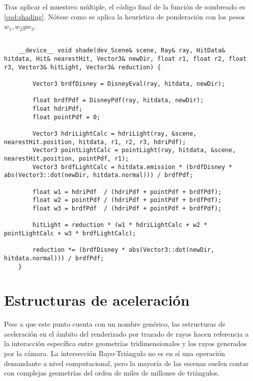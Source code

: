 Tras aplicar el muestreo múltiple, el código final de la función de sombreado es \autoref{cod:shading}. Nótese como se aplica la heurística de ponderación con los pesos $w_1, w_2 y w_3$.

\begin{minipage}[c]{0.95\textwidth}
\begin{lstlisting}[label={cod:shading}, caption={Código para el muestreo por importancia múltiple}]

	__device__ void shade(dev_Scene& scene, Ray& ray, HitData& hitdata, Hit& nearestHit, Vector3& newDir, float r1, float r2, float r3, Vector3& hitLight, Vector3& reduction) {

		Vector3 brdfDisney = DisneyEval(ray, hitdata, newDir);

		float brdfPdf = DisneyPdf(ray, hitdata, newDir);
		float hdriPdf;
		float pointPdf = 0;

		Vector3 hdriLightCalc = hdriLight(ray, &scene, nearestHit.position, hitdata, r1, r2, r3, hdriPdf);
		Vector3 pointLightCalc = pointLight(ray, hitdata, &scene, nearestHit.position, pointPdf, r1);
		Vector3 brdfLightCalc = hitdata.emission * (brdfDisney * abs(Vector3::dot(newDir, hitdata.normal))) / brdfPdf;

		float w1 = hdriPdf  / (hdriPdf + pointPdf + brdfPdf);
		float w2 = pointPdf / (hdriPdf + pointPdf + brdfPdf);
		float w3 = brdfPdf  / (hdriPdf + pointPdf + brdfPdf);

		hitLight = reduction * (w1 * hdriLightCalc + w2 * pointLightCalc + w3 * brdfLightCalc);

		reduction *= (brdfDisney * abs(Vector3::dot(newDir, hitdata.normal))) / brdfPdf;
	}

\end{lstlisting}
\end{minipage}

\section{Estructuras de aceleración}
\label{BVH}
	
Pese a que este punto cuenta con un nombre genérico, las estructuras de aceleración en el ámbito del renderizado por trazado de rayos hacen referencia a la interacción específica entre geometrías tridimensionales y los rayos generados por la cámara. La intersección Rayo-Triángulo no es en sí una operación demandante a nivel computacional, pero la mayoría de las escenas suelen contar con complejas geometrías del orden de miles de millones de triángulos.

